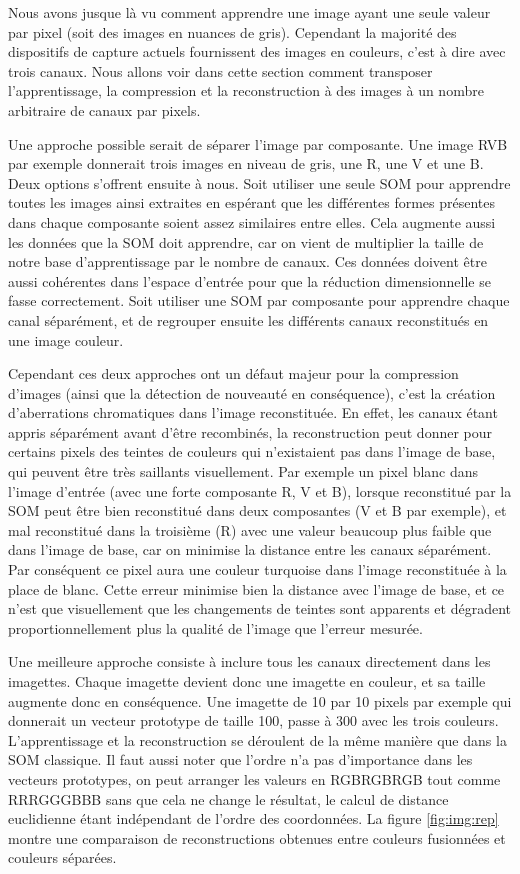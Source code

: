 	Nous avons jusque là vu comment apprendre une image ayant une seule valeur par pixel (soit des images en nuances de gris). Cependant la majorité des dispositifs de capture actuels fournissent des images en couleurs, c'est à dire avec trois canaux. Nous allons voir dans cette section comment transposer l'apprentissage, la compression et la reconstruction à des images à un nombre arbitraire de canaux par pixels.

	Une approche possible serait de séparer l'image par composante. Une image RVB par exemple donnerait trois images en niveau de gris, une R, une V et une B. Deux options s'offrent ensuite à nous. Soit utiliser une seule SOM pour apprendre toutes les images ainsi extraites en espérant que les différentes formes présentes dans chaque composante soient assez similaires entre elles. Cela augmente aussi les données que la SOM doit apprendre, car on vient de multiplier la taille de notre base d'apprentissage par le nombre de canaux. Ces données doivent être aussi cohérentes dans l'espace d'entrée pour que la réduction dimensionnelle se fasse correctement. Soit utiliser une SOM par composante pour apprendre chaque canal séparément, et de regrouper ensuite les différents canaux reconstitués en une image couleur. 
	
	Cependant ces deux approches ont un défaut majeur pour la compression d'images (ainsi que la détection de nouveauté en conséquence), c'est la création d'aberrations chromatiques dans l'image reconstituée. En effet, les canaux étant appris séparément avant d'être recombinés, la reconstruction peut donner pour certains pixels des teintes de couleurs qui n'existaient pas dans l'image de base, qui peuvent être très saillants visuellement. Par exemple un pixel blanc dans l'image d'entrée (avec une forte composante R, V et B), lorsque reconstitué par la SOM peut être bien reconstitué dans deux composantes (V et B par exemple), et mal reconstitué dans la troisième (R) avec une valeur beaucoup plus faible que dans l'image de base, car on minimise la distance entre les canaux séparément. Par conséquent ce pixel aura une couleur turquoise dans l'image reconstituée à la place de blanc. Cette erreur minimise bien la distance avec l'image de base, et ce n'est que visuellement que les changements de teintes sont apparents et dégradent proportionnellement plus la qualité de l'image que l'erreur mesurée.

	Une meilleure approche consiste à inclure tous les canaux directement dans les imagettes. Chaque imagette devient donc une imagette en couleur, et sa taille augmente donc en conséquence. Une imagette de 10 par 10 pixels par exemple qui donnerait un vecteur prototype de taille 100, passe à 300 avec les trois couleurs. L'apprentissage et la reconstruction se déroulent de la même manière que dans la SOM classique. Il faut aussi noter que l'ordre n'a pas d'importance dans les vecteurs prototypes, on peut arranger les valeurs en RGBRGBRGB tout comme RRRGGGBBB sans que cela ne change le résultat, le calcul de distance euclidienne étant indépendant de l'ordre des coordonnées. La figure \ref{fig:img:rep} montre une comparaison de reconstructions obtenues entre couleurs fusionnées et couleurs séparées.

